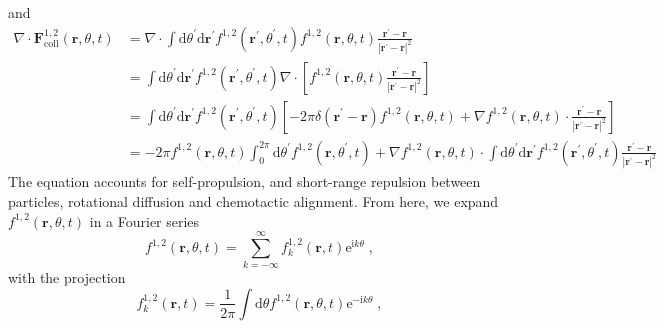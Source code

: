 \documentclass{article}
\begin{document}
and 
\begin{equation}
    \begin{aligned}
        \nabla \cdot \mathbf{F}_{\mathrm{coll}}^{1,2}\left( \mathbf{r},\theta ,t \right) &=\nabla \cdot \int{\mathrm{d}\theta ^{\prime}\mathrm{d}\mathbf{r}^{\prime}f^{1,2}\left( \mathbf{r}^{\prime},\theta ^{\prime},t \right) f^{1,2}\left( \mathbf{r},\theta ,t \right) \frac{\mathbf{r}^{\prime}-\mathbf{r}}{\left| \mathbf{r}^{\prime}-\mathbf{r} \right|^2}}\\
        &=\int{\mathrm{d}\theta ^{\prime}\mathrm{d}\mathbf{r}^{\prime}f^{1,2}\left( \mathbf{r}^{\prime},\theta ^{\prime},t \right) \nabla \cdot \left[ f^{1,2}\left( \mathbf{r},\theta ,t \right) \frac{\mathbf{r}^{\prime}-\mathbf{r}}{\left| \mathbf{r}^{\prime}-\mathbf{r} \right|^2} \right]}\\
        &=\int{\mathrm{d}\theta ^{\prime}\mathrm{d}\mathbf{r}^{\prime}f^{1,2}\left( \mathbf{r}^{\prime},\theta ^{\prime},t \right) \left[ -2\pi \delta \left( \mathbf{r}^{\prime}-\mathbf{r} \right) f^{1,2}\left( \mathbf{r},\theta ,t \right) +\nabla f^{1,2}\left( \mathbf{r},\theta ,t \right) \cdot \frac{\mathbf{r}^{\prime}-\mathbf{r}}{\left| \mathbf{r}^{\prime}-\mathbf{r} \right|^2} \right]}\\
        &=-2\pi f^{1,2}\left( \mathbf{r},\theta ,t \right) \int_0^{2\pi}{\mathrm{d}\theta ^{\prime}f^{1,2}\left( \mathbf{r},\theta ^{\prime},t \right)}+\nabla f^{1,2}\left( \mathbf{r},\theta ,t \right) \cdot \int{\mathrm{d}\theta ^{\prime}\mathrm{d}\mathbf{r}^{\prime}f^{1,2}\left( \mathbf{r}^{\prime},\theta ^{\prime},t \right) \frac{\mathbf{r}^{\prime}-\mathbf{r}}{\left| \mathbf{r}^{\prime}-\mathbf{r} \right|^2}}
    \end{aligned}
\end{equation}
The equation accounts for self-propulsion, and short-range repulsion between particles, rotational diffusion and chemotactic alignment.
From here, we expand $f^{1,2}\left( \mathbf{r},\theta ,t \right)$ in a Fourier series 
\begin{equation}
    f ^{1,2}\left( \mathbf{r},\theta ,t \right) =\sum_{k=-\infty}^{\infty}{f _{k}^{1,2}\left( \mathbf{r},t \right) \mathrm{e}^{\mathrm{i}k\theta}}\;,
\end{equation} 
with the projection 
\begin{equation}
    \label{eq:fourierCoefficients}
    f _{k}^{1,2}\left( \mathbf{r},t \right) =\frac{1}{2\pi}\int{\mathrm{d}\theta f ^{1,2}\left( \mathbf{r},\theta ,t \right) \mathrm{e}^{-\mathrm{i}k\theta}}\;,
\end{equation}
\end{document}
